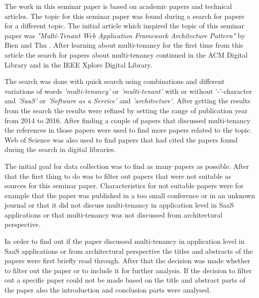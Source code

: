 \documentclass[conference]{sasmoota2017}
\begin{document}
The work in this seminar paper is based on academic papers and technical articles. The topic for this seminar paper was found during a search for papers for a different topic. The initial article which inspired the topic of this seminar paper was \textit{"Multi-Tenant Web Application Framework Architecture Pattern"} by Bien and Thu \cite{Bien:2015:MultiTenantWebApp}. After learning about multi-tenancy for the first time from this article the search for papers about multi-tenancy continued in the ACM Digital Library and in the IEEE Xplore Digital Library. 

The search was done with quick search using combinations and different variations of words \textit{'multi-tenancy'} or \textit{'multi-tenant'} with or without '-'-character and \textit{'SaaS'} or \textit{'Software as a Service'} and \textit{'architecture'}. After getting the results from the search the results were refined by setting the range of publication year from 2014 to 2016. After finding a couple of papers that discussed multi-tenancy the references in those papers were used to find more papers related to the topic. Web of Science was also used to find papers that had cited the papers found during the search in digital libraries.

The initial goal for data collection was to find as many papers as possible. After that the first thing to do was to filter out papers that were not suitable as sources for this seminar paper. Characteristics for not suitable papers were for example that the paper was published in a too small conference or in an unknown journal or that it did not discuss multi-tenancy in application level in SaaS applications or that multi-tenancy was not discussed from architectural perspective. 

In order to find out if the paper discussed multi-tenancy in application level in SaaS applications or from architectural perspective the titles and abstracts of the papers were first briefly read through. After that the decision was made whether to filter out the paper or to include it for further analysis. If the decision to filter out a specific paper could not be made based on the title and abstract parts of the paper also the introduction and conclusion parts were analysed. 
\end{document}
